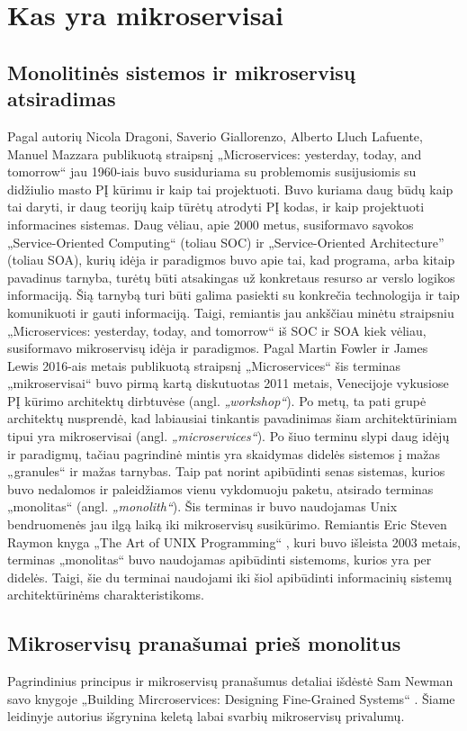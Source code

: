\section{Kas yra mikroservisai}

\subsection{Monolitinės sistemos ir mikroservisų atsiradimas}
Pagal autorių Nicola Dragoni, Saverio Giallorenzo, Alberto Lluch Lafuente, Manuel Mazzara publikuotą straipsnį „Microservices: yesterday, today, and tomorrow“
\cite{Misc7} jau 1960-iais buvo susiduriama su problemomis susijusiomis su didžiulio masto PĮ kūrimu ir kaip tai projektuoti.
Buvo kuriama daug būdų kaip tai daryti, ir daug teorijų kaip tūrėtų atrodyti PĮ kodas, ir kaip projektuoti informacines sistemas.
Daug vėliau, apie 2000 metus, susiformavo sąvokos „Service-Oriented Computing“ (toliau SOC) ir „Service-Oriented Architecture” (toliau SOA), kurių idėja ir paradigmos buvo apie
tai, kad programa, arba kitaip pavadinus tarnyba, turėtų būti atsakingas už konkretaus resurso ar verslo logikos informaciją.
Šią tarnybą turi būti galima pasiekti su konkrečia technologija ir taip komunikuoti ir gauti informaciją. 
Taigi, remiantis jau ankščiau minėtu straipsniu „Microservices: yesterday, today, and tomorrow“ \cite{Mis7} iš SOC ir SOA kiek vėliau, susiformavo
mikroservisų idėja ir paradigmos. Pagal Martin Fowler ir James Lewis 2016-ais metais publikuotą straipsnį „Microservices“ \cite{Misc6}
šis terminas „mikroservisai“ buvo pirmą kartą diskutuotas 2011 metais, Venecijoje vykusiose PĮ kūrimo architektų
dirbtuvėse (angl. \textit{„workshop“}). Po metų, ta pati grupė architektų nusprendė, kad labiausiai tinkantis pavadinimas
šiam architektūriniam tipui yra mikroservisai (angl. \textit{„microservices“}). Po šiuo terminu slypi daug idėjų ir paradigmų,
tačiau pagrindinė mintis yra skaidymas didelės sistemos į mažas „granules“ ir mažas tarnybas.
Taip pat norint apibūdinti senas sistemas, kurios buvo nedalomos ir paleidžiamos vienu vykdomuoju paketu, atsirado terminas „monolitas“ (angl. \textit{„monolith“}).
Šis terminas ir buvo naudojamas Unix bendruomenės jau ilgą laiką iki mikroservisų susikūrimo.
Remiantis Eric Steven Raymon knyga „The Art of UNIX Programming“ \cite{Bk4}, kuri buvo išleista 2003 metais,
terminas „monolitas“ buvo naudojamas apibūdinti sistemoms, kurios yra per didelės. Taigi, šie du terminai
naudojami iki šiol apibūdinti informacinių sistemų architektūrinėms charakteristikoms.
\subsection{Mikroservisų pranašumai prieš monolitus}
Pagrindinius principus ir mikroservisų pranašumus detaliai išdėstė Sam Newman savo knygoje „Building Mircroservices: Designing Fine-Grained Systems“ \cite{Bk2}.
Šiame leidinyje autorius išgrynina keletą labai svarbių mikroservisų privalumų.
